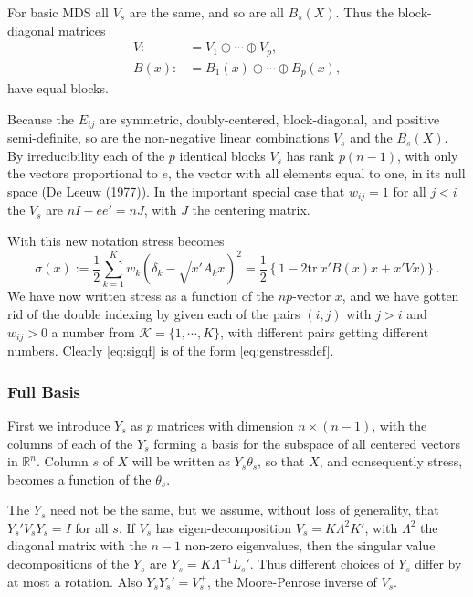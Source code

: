 \documentclass[
  12pt,
]{article}
\begin{document}
For basic MDS all \(V_s\) are the same, and so are all \(B_s(X)\). Thus the
block-diagonal matrices
\begin{align}
V:&=V_1\oplus\cdots\oplus V_p,\\
B(x):&=B_1(x)\oplus\cdots\oplus B_p(x),
\end{align}
have equal blocks.

Because the \(E_{ij}\) are symmetric, doubly-centered, block-diagonal, and positive
semi-definite, so are the non-negative linear combinations \(V_s\) and the \(B_s(X)\).
By irreducibility each of the \(p\) identical blocks \(V_s\) has rank \(p(n-1)\), with only the
vectors proportional to \(e\), the vector with all elements equal to one,
in its null space (De Leeuw (1977)). In the important special case that \(w_{ij}=1\) for all \(j<i\) the \(V_s\) are \(nI-ee'=nJ\), with \(J\) the centering matrix.

With this new notation stress becomes
\begin{equation}
\sigma(x):=\frac12\sum_{k=1}^Kw_k(\delta_k-\sqrt{x'A_kx})^2=\frac12\left\{1-2\text{tr}\ x'B(x)x+x'Vx)\right\}.
\label{eq:sigqf}
\end{equation}
We have now written stress as a function of the \(np\)-vector \(x\), and we have gotten rid of the
double indexing by given each of the pairs \((i,j)\) with \(j>i\) and \(w_{ij}>0\) a number from
\(\mathcal{K}=\{1,\cdots,K\}\), with different pairs getting different numbers. Clearly
\eqref{eq:sigqf} is of the form \eqref{eq:genstressdef}.

\subsubsection{Full Basis}\label{full-basis}

First we introduce \(Y_s\) as \(p\) matrices with dimension
\(n\times(n-1)\), with the columns of each of the \(Y_s\) forming a basis
for the subspace of all centered vectors in \(\mathbb{R}^n\). Column
\(s\) of \(X\) will be written as \(Y_s\theta_s\), so that \(X\), and consequently
stress, becomes a function of the \(\theta_s\).

The \(Y_s\) need not be the same, but we assume, without loss of generality, that
\(Y_s'V_sY_s=I\) for all \(s\). If \(V_s\) has eigen-decomposition \(V_s=K\Lambda^2 K'\),
with \(\Lambda^2\) the diagonal matrix with the \(n-1\) non-zero eigenvalues,
then the singular value decompositions of the \(Y_s\) are \(Y_s=K\Lambda^{-1} L_s'\).
Thus different choices of \(Y_s\) differ by at most a rotation.
Also \(Y_sY_s'=V_s^+\), the Moore-Penrose inverse of \(V_s\).
\end{document}
